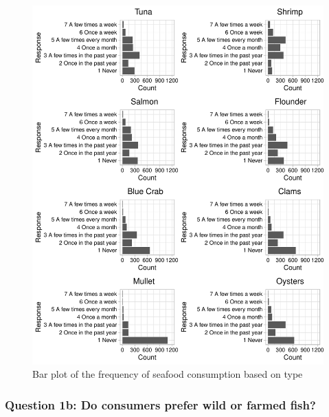 \documentclass[
  12pt,
]{article}
\begin{document}
\begin{figure}
\centering
\includegraphics{Final_rmd_files/figure-latex/frequency-1.pdf}
\caption{Bar plot of the frequency of seafood consumption based on type}
\end{figure}

\hypertarget{question-1b-do-consumers-prefer-wild-or-farmed-fish}{%
\subsubsection{Question 1b: Do consumers prefer wild or farmed
fish?}\label{question-1b-do-consumers-prefer-wild-or-farmed-fish}}
\end{document}
